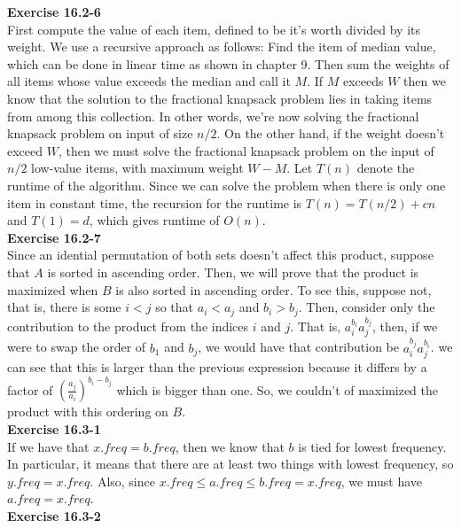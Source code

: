 \documentclass{article}
\begin{document}
\noindent\textbf{Exercise 16.2-6}\\

First compute the value of each item, defined to be it's worth divided by its weight.  We use a recursive approach as follows: Find the item of median value, which can be done in linear time as shown in chapter 9.  Then sum the weights of all items whose value exceeds the median and call it $M$.  If $M$ exceeds $W$ then we know that the solution to the fractional knapsack problem lies in taking items from among this collection.  In other words, we're now solving the fractional knapsack problem on input of size $n/2$.  On the other hand, if the weight doesn't exceed $W$, then we must solve the fractional knapsack problem on the input of $n/2$ low-value items, with maximum weight $W-M$.  Let $T(n)$ denote the runtime of the algorithm.  Since we can solve the problem when there is only one item in constant time, the recursion for the runtime is $T(n) = T(n/2) + cn$ and $T(1) = d$, which gives runtime of $O(n)$. \\

\noindent\textbf{Exercise 16.2-7}\\

Since an idential permutation of both sets doesn't affect this product, suppose that $A$ is sorted in ascending order. Then, we will prove that the product is maximized when $B$ is also sorted in ascending order. To see this, suppose not, that is, there is some $i < j$ so that $a_i<a_j$ and $b_i > b_j$. Then, consider only the contribution to the product from the indices $i$ and $j$. That is, $a_i^{b_i}a_j^{b_j}$, then, if we were to swap the order of $b_1$ and $b_j$, we would have that contribution be $a_i^{b_j}a_j^{b_i}$. we can see that this is larger than the previous expression because it differs by a factor of $(\frac{a_j}{a_i})^{b_i-b_j}$ which is bigger than one. So, we couldn't of maximized the product with this ordering on $B$.\\

\noindent\textbf{Exercise 16.3-1}\\

If we have that $x.freq = b.freq$, then we know that $b$ is tied for lowest frequency. In particular, it means that there are at least two things with lowest frequency, so $y.freq = x.freq$. Also, since $x.freq \le a.freq \le b.freq = x.freq$, we must have $a.freq = x.freq$.\\

\noindent\textbf{Exercise 16.3-2}\\
\end{document}
